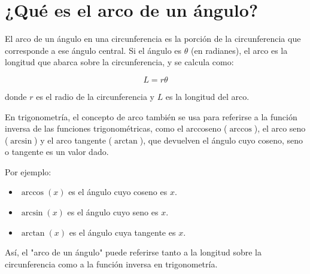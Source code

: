 \section{¿Qué es el arco de un ángulo?}\label{sec:arcoangulo}

El arco de un ángulo en una circunferencia es la porción de la circunferencia que corresponde a ese ángulo central. Si el ángulo es $\theta$ (en radianes), el arco es la longitud que abarca sobre la circunferencia, y se calcula como:

\[
    L = r \theta
\]

donde $r$ es el radio de la circunferencia y $L$ es la longitud del arco.

En trigonometría, el concepto de arco también se usa para referirse a la función inversa de las funciones trigonométricas, como el arccoseno ($\arccos$), el arco seno ($\arcsin$) y el arco tangente ($\arctan$), que devuelven el ángulo cuyo coseno, seno o tangente es un valor dado.

Por ejemplo:
\begin{itemize}
    \item $\arccos(x)$ es el ángulo cuyo coseno es $x$.
    \item $\arcsin(x)$ es el ángulo cuyo seno es $x$.
    \item $\arctan(x)$ es el ángulo cuya tangente es $x$.
\end{itemize}

Así, el "arco de un ángulo" puede referirse tanto a la longitud sobre la circunferencia como a la función inversa en trigonometría.
